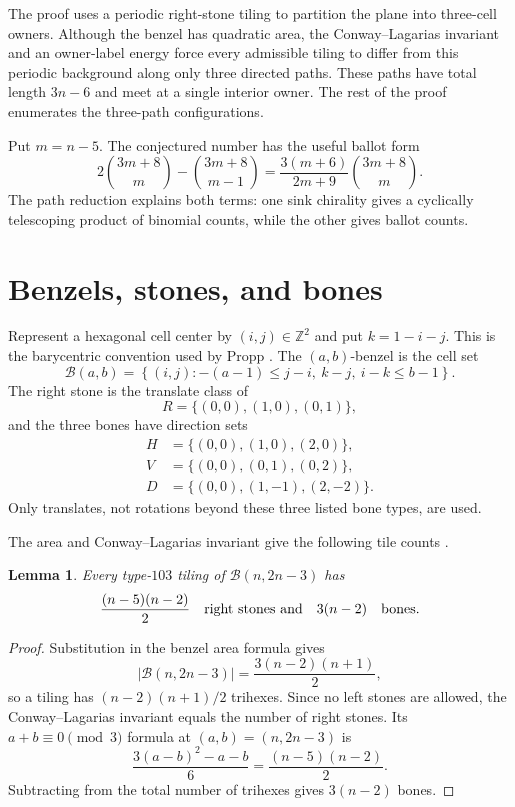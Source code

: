 \documentclass[11pt]{amsart}
\newtheorem{lemma}[theorem]{Lemma}
\theoremstyle{definition}
\newcommand{\Bz}{\mathcal B}
\begin{document}
The proof uses a periodic right-stone tiling to partition the plane into
three-cell owners.  Although the benzel has quadratic area, the
Conway--Lagarias invariant and an owner-label energy force every admissible
tiling to differ from this periodic background along only three directed
paths.  These paths have total length $3n-6$ and meet at a single interior
owner.  The rest of the proof enumerates the three-path configurations.

Put $m=n-5$.  The conjectured number has the useful ballot form
\begin{equation}\label{eq:ballot-form}
 2\binom{3m+8}{m}-\binom{3m+8}{m-1}
 =\frac{3(m+6)}{2m+9}\binom{3m+8}{m}.
\end{equation}
The path reduction explains both terms: one sink chirality gives a cyclically
telescoping product of binomial counts, while the other gives ballot counts.

\section{Benzels, stones, and bones}

Represent a hexagonal cell center by $(i,j)\in\mathbb Z^2$ and put
$k=1-i-j$.  This is the barycentric convention used by Propp
\cite{ProppProblems}.  The $(a,b)$-benzel is the cell set
\[
 \Bz(a,b)=\left\{(i,j):
 -(a-1)\leq j-i,\ k-j,\ i-k\leq b-1\right\}.
\]
The right stone is the translate class of
\[
 R=\{(0,0),(1,0),(0,1)\},
\]
and the three bones have direction sets
\[
\begin{aligned}
 H&=\{(0,0),(1,0),(2,0)\},\\
 V&=\{(0,0),(0,1),(0,2)\},\\
 D&=\{(0,0),(1,-1),(2,-2)\}.
\end{aligned}
\]
Only translates, not rotations beyond these three listed bone types, are
used.

The area and Conway--Lagarias invariant give the following tile counts
\cite{ConwayLagarias,ProppProblems}.

\begin{lemma}\label{lem:tile-counts}
Every type-$103$ tiling of $\Bz(n,2n-3)$ has
\[
 \frac{(n-5)(n-2)}2
 \quad\hbox{right stones and}\quad
 3(n-2)\quad\hbox{bones}.
\]
\end{lemma}

\begin{proof}
Substitution in the benzel area formula gives
\[
 |\Bz(n,2n-3)|=\frac{3(n-2)(n+1)}2,
\]
so a tiling has $(n-2)(n+1)/2$ trihexes.  Since no left stones are allowed,
the Conway--Lagarias invariant equals the number of right stones.  Its
$a+b\equiv0\pmod3$ formula at $(a,b)=(n,2n-3)$ is
\[
 \frac{3(a-b)^2-a-b}{6}
 =\frac{(n-5)(n-2)}2.
\]
Subtracting from the total number of trihexes gives $3(n-2)$ bones.
\end{proof}
\end{document}
